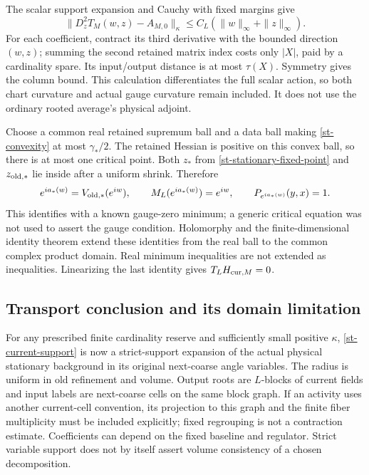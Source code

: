 The scalar support expansion and Cauchy with fixed margins give
\begin{equation}
 \|D_z^2T_M(w,z)-A_{M,0}\|_\kappa
                \le C_L(\|w\|_\infty+\|z\|_\infty).         \label{st-convexity}
\end{equation}
For each coefficient, contract its third derivative with the bounded
direction $(w,z)$; summing the second retained matrix index costs only
$|X|$, paid by a cardinality spare. Its input/output distance is at
most $\tau(X)$. Symmetry gives the column bound. This calculation
differentiates the full scalar action, so both chart curvature and
actual gauge curvature remain included. It does not use the ordinary
rooted average's physical adjoint.

Choose a common real retained supremum ball and a data ball making
\eqref{st-convexity} at most $\gamma_*/2$. The retained Hessian is
positive on this convex ball, so there is at most one critical point.
Both $z_*$ from \eqref{st-stationary-fixed-point} and
$z_{{\rm old},*}$ lie inside after a uniform shrink. Therefore
\begin{equation}
 e^{ia_*(w)}=V_{{\rm old},*}(e^{iw}),\qquad
 M_L(e^{ia_*(w)})=e^{iw},\qquad P_{e^{ia_*(w)}}(y,x)=1.       \label{st-physical-identities}
\end{equation}
This identifies with a known gauge-zero minimum; a generic critical
equation was not used to assert the gauge condition. Holomorphy and the
finite-dimensional identity theorem extend these identities from the
real ball to the common complex product domain. Real minimum
inequalities are not extended as inequalities. Linearizing the last
identity gives $T_LH_{{\rm cur},M}=0$.

\subsection{Transport conclusion and its domain limitation}
\label{st-scope-section}

For any prescribed finite cardinality reserve and sufficiently small
positive $\kappa$, \eqref{st-current-support} is now a strict-support
expansion of the actual physical stationary background in its original
next-coarse angle variables. The radius is uniform in old refinement
and volume. Output roots are $L$-blocks of current fields and input
labels are next-coarse cells on the same block graph. If an activity
uses another current-cell convention, its projection to this graph and
the finite fiber multiplicity must be included explicitly; fixed
regrouping is not a contraction estimate. Coefficients can depend on
the fixed baseline and regulator. Strict variable support does not by
itself assert volume consistency of a chosen decomposition.

